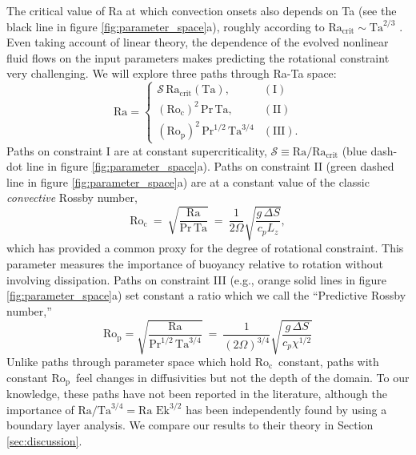 \documentclass[twocolumn, amsmath, amsfonts, amssymb, trackchanges]{aastex62}
\newcommand{\pro}{\ensuremath{\text{Ro}_{\text{p}}}}
\newcommand{\con}{\ensuremath{\text{Ro}_{\text{c}}}}
\begin{document}
The critical value of Ra at which  convection onsets also depends on Ta (see the black line in figure \ref{fig:parameter_space}a),
roughly according to $\text{Ra}_{\text{crit}} \sim \text{Ta}^{2/3}$ \citep{Chandrasekhar,calkins&all2015a}.
Even taking account of linear theory, the dependence of the evolved nonlinear fluid 
flows on the input parameters makes predicting the rotational constraint very challenging. 
We will explore three paths through Ra-Ta space:
\begin{equation}
    \text{Ra} = 
    \begin{cases}
    \mathcal{S}\,\text{Ra}_\text{crit}(\text{Ta}), & (\text{I})\\
    (\con)^2 \, \text{Pr}\, \text{Ta}, & (\text{II}) \\
    (\pro)^2\, \text{Pr}^{1/2}\, \text{Ta}^{3/4} & (\text{III}).
    \end{cases}
    \label{eqn:paths}
\end{equation}
Paths on constraint I are at constant supercriticality, 
$\mathcal{S} \equiv \text{Ra}/\text{Ra}_{\text{crit}}$
(blue dash-dot line in figure \ref{fig:parameter_space}a).
Paths on constraint II (green dashed line in figure \ref{fig:parameter_space}a)
are at a constant value of the classic
\textit{convective} Rossby number, 
\begin{equation}
\con \ = \   \sqrt{ \frac{\text{Ra}}{\text{Pr}\, \text{Ta} } } \ 
= \  \frac{1}{2 \Omega } \sqrt{\frac{g \, \Delta  S}{c_{p} L_{z}}},
\label{eqn:roc_defn}
\end{equation}
which has provided \citep[e.g., ][]{julien&all1996, brummell&all1996} 
a common proxy for the degree of rotational constraint.
This parameter measures the importance of buoyancy relative to rotation without 
involving dissipation.  
Paths on constraint
III (e.g., orange solid lines in figure \ref{fig:parameter_space}a) 
set constant a ratio which we call the ``Predictive Rossby number,'' 
\begin{equation}
\pro = \sqrt{\frac{\text{Ra}}{\text{Pr}^{1/2}\,\text{Ta}^{3/4}}} \ = \    
\frac{1}{(2 \Omega)^{3/4}} \sqrt{\frac{g \, \Delta  S}{c_{p} \chi^{1/2}}}
\label{eqn:rop_defn}
\end{equation}
Unlike paths through parameter space which hold \con$\,$ constant,
paths with constant \pro$\,$ 
feel changes in diffusivities but not the depth of the domain.
To our knowledge, these paths have not been reported in the literature, 
although the importance of $\text{Ra}/\text{Ta}^{3/4} = \text{Ra Ek}^{3/2}$
has been independently found by \cite{king&all2012} using a boundary layer
analysis. We compare our results to their theory in Section \ref{sec:discussion}. 
\end{document}
